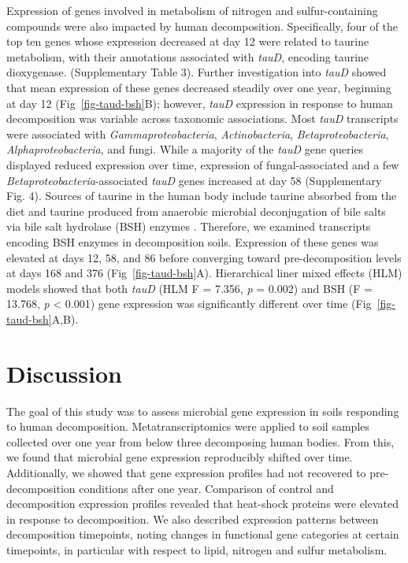 \documentclass[
  sn-nature,
  lineno, referee]{sn-jnl}
\begin{document}
Expression of genes involved in metabolism of nitrogen and
sulfur-containing compounds were also impacted by human decomposition.
Specifically, four of the top ten genes whose expression decreased at
day 12 were related to taurine metabolism, with their annotations
associated with \emph{tauD}, encoding taurine dioxygenase.
(Supplementary Table 3). Further investigation into \emph{tauD} showed
that mean expression of these genes decreased steadily over one year,
beginning at day 12 (Fig~\ref{fig-taud-bsh}B); however, \emph{tauD}
expression in response to human decomposition was variable across
taxonomic associations. Most \emph{tauD} transcripts were associated
with \emph{Gammaproteobacteria}, \emph{Actinobacteria},
\emph{Betaproteobacteria}, \emph{Alphaproteobacteria}, and fungi. While
a majority of the \emph{tauD} gene queries displayed reduced expression
over time, expression of fungal-associated and a few
\emph{Betaproteobacteria}-associated \emph{tauD} genes increased at day
58 (Supplementary Fig. 4). Sources of taurine in the human body include
taurine absorbed from the diet and taurine produced from anaerobic
microbial deconjugation of bile salts via bile salt hydrolase (BSH)
enzymes \citep{urdaneta_interactions_2017}. Therefore, we examined
transcripts encoding BSH enzymes in decomposition soils. Expression of
these genes was elevated at days 12, 58, and 86 before converging toward
pre-decomposition levels at days 168 and 376 (Fig~\ref{fig-taud-bsh}A).
Hierarchical liner mixed effects (HLM) models showed that both
\emph{tauD} (HLM F = 7.356, \emph{p} = 0.002) and BSH (F = 13.768,
\emph{p} \textless{} 0.001) gene expression was significantly different
over time (Fig~\ref{fig-taud-bsh}A,B).

\section{Discussion}\label{discussion}

The goal of this study was to assess microbial gene expression in soils
responding to human decomposition. Metatranscriptomics were applied to
soil samples collected over one year from below three decomposing human
bodies. From this, we found that microbial gene expression reproducibly
shifted over time. Additionally, we showed that gene expression profiles
had not recovered to pre-decomposition conditions after one year.
Comparison of control and decomposition expression profiles revealed
that heat-shock proteins were elevated in response to decomposition. We
also described expression patterns between decomposition timepoints,
noting changes in functional gene categories at certain timepoints, in
particular with respect to lipid, nitrogen and sulfur metabolism.
\end{document}
